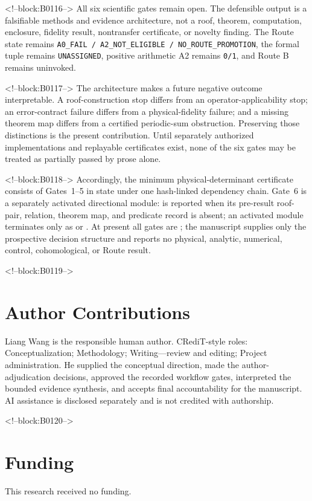 \documentclass[11pt,a4paper]{article}
\begin{document}
<!--block:B0116-->
All six scientific gates remain open. The defensible output is a falsifiable methods and evidence architecture, not a roof, theorem, computation, enclosure, fidelity result, nontransfer certificate, or novelty finding. The Route state remains \texttt{A0\_FAIL\ /\ A2\_NOT\_ELIGIBLE\ /\ NO\_ROUTE\_PROMOTION}, the formal tuple remains \texttt{UNASSIGNED}, positive arithmetic A2 remains \texttt{0/1}, and Route B remains uninvoked.

<!--block:B0117-->
The architecture makes a future negative outcome interpretable. A roof-construction stop differs from an operator-applicability stop; an error-contract failure differs from a physical-fidelity failure; and a missing theorem map differs from a certified periodic-sum obstruction. Preserving those distinctions is the present contribution. Until separately authorized implementations and replayable certificates exist, none of the six gates may be treated as partially passed by prose alone.

<!--block:B0118-->
Accordingly, the minimum physical-determinant certificate consists of Gates~1--5 in  state under one hash-linked dependency chain. Gate~6 is a separately activated directional module:  is reported when its pre-result roof-pair, relation, theorem map, and predicate record is absent; an activated module terminates only as  or . At present all gates are ; the manuscript supplies only the prospective decision structure and reports no physical, analytic, numerical, control, cohomological, or Route result.

<!--block:B0119-->
\section*{Author Contributions}
Liang Wang is the responsible human author. CRediT-style roles: Conceptualization; Methodology; Writing---review and editing; Project administration. He supplied the conceptual direction, made the author-adjudication decisions, approved the recorded workflow gates, interpreted the bounded evidence synthesis, and accepts final accountability for the manuscript. AI assistance is disclosed separately and is not credited with authorship.

<!--block:B0120-->
\section*{Funding}
This research received no funding.
\end{document}

